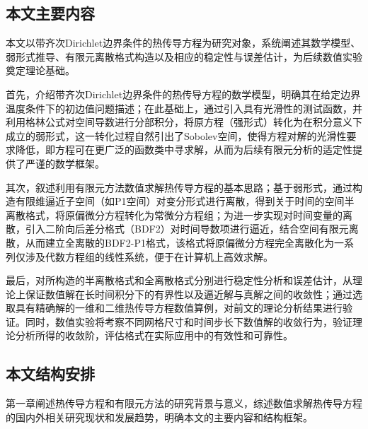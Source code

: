\documentclass{GZUbachelorthesis}
\theoremstyle{chineseplain}
\begin{document}
\subsection{本文主要内容}
本文以带齐次Dirichlet边界条件的热传导方程为研究对象，系统阐述其数学模型、弱形式推导、有限元离散格式构造以及相应的稳定性与误差估计，为后续数值实验奠定理论基础。

首先，介绍带齐次Dirichlet边界条件的热传导方程的数学模型，明确其在给定边界温度条件下的初边值问题描述；在此基础上，通过引入具有光滑性的测试函数，并利用格林公式对空间导数进行分部积分，将原方程（强形式）转化为在积分意义下成立的弱形式，这一转化过程自然引出了Sobolev空间，使得方程对解的光滑性要求降低，即方程可在更广泛的函数类中寻求解，从而为后续有限元分析的适定性提供了严谨的数学框架。

其次，叙述利用有限元方法数值求解热传导方程的基本思路；基于弱形式，通过构造有限维逼近子空间（如P1空间）对变分形式进行离散，得到关于时间的空间半离散格式，将原偏微分方程转化为常微分方程组；为进一步实现对时间变量的离散，引入二阶向后差分格式（BDF2）对时间导数项进行逼近，结合空间有限元离散，从而建立全离散的BDF2-P1格式，该格式将原偏微分方程完全离散化为一系列仅涉及代数方程组的线性系统，便于在计算机上高效求解。

最后，对所构造的半离散格式和全离散格式分别进行稳定性分析和误差估计，从理论上保证数值解在长时间积分下的有界性以及逼近解与真解之间的收敛性；通过选取具有精确解的一维和二维热传导方程数值算例，对前文的理论分析结果进行验证。同时，数值实验将考察不同网格尺寸和时间步长下数值解的收敛行为，验证理论分析所得的收敛阶，评估格式在实际应用中的有效性和可靠性。
\subsection{本文结构安排}
第一章阐述热传导方程和有限元方法的研究背景与意义，综述数值求解热传导方程的国内外相关研究现状和发展趋势，明确本文的主要内容和结构框架。
\end{document}
